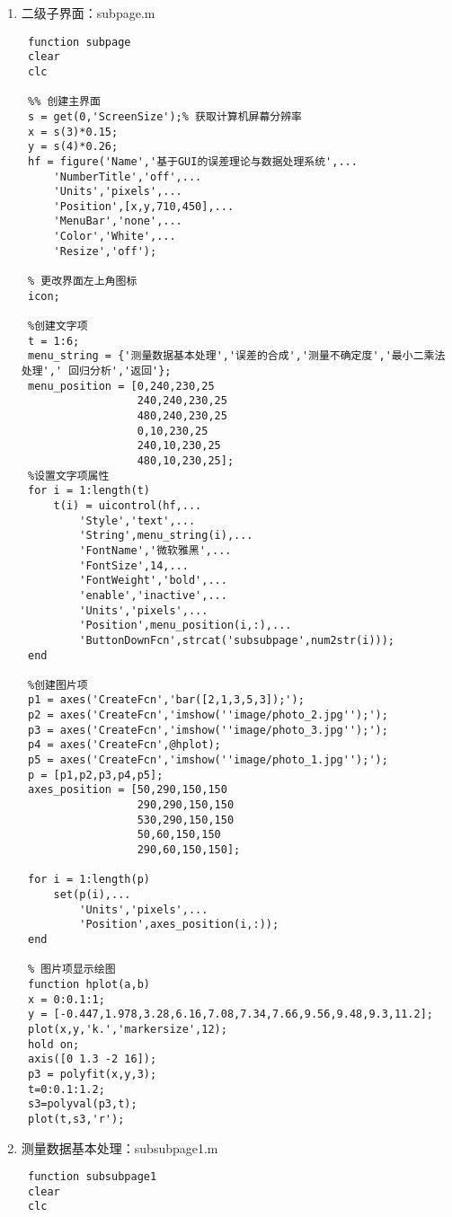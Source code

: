 \begin{enumerate}
\begin{lstlisting}
 % 显示学校名称PNG图片函数
 function school_logo(a,b)
 [I,c,alpha] = imread('image/school_logo.png');
 h = imshow(I);
 set(h,'AlphaData',alpha);
 
 %% 主界面退出对话框
 function hexit(a,b)
 he = questdlg('你确定退出吗？','退出程序','是','否','否');
 if strcmp(he,'是')
     close;
     clear;
     clc;
 end;\end{lstlisting}
	\item 二级子界面：subpage.m
	\begin{lstlisting}
 function subpage
 clear
 clc
 
 %% 创建主界面
 s = get(0,'ScreenSize');% 获取计算机屏幕分辨率
 x = s(3)*0.15;
 y = s(4)*0.26;
 hf = figure('Name','基于GUI的误差理论与数据处理系统',...
     'NumberTitle','off',...
     'Units','pixels',...
     'Position',[x,y,710,450],...
     'MenuBar','none',...
     'Color','White',...
     'Resize','off');
 
 % 更改界面左上角图标
 icon;
 
 %创建文字项
 t = 1:6;
 menu_string = {'测量数据基本处理','误差的合成','测量不确定度','最小二乘法处理',' 回归分析','返回'};
 menu_position = [0,240,230,25
                  240,240,230,25
                  480,240,230,25
                  0,10,230,25
                  240,10,230,25
                  480,10,230,25];
 %设置文字项属性
 for i = 1:length(t)
     t(i) = uicontrol(hf,...
         'Style','text',...
         'String',menu_string(i),...
         'FontName','微软雅黑',...
         'FontSize',14,...
         'FontWeight','bold',...
         'enable','inactive',...
         'Units','pixels',...
         'Position',menu_position(i,:),...
         'ButtonDownFcn',strcat('subsubpage',num2str(i)));
 end
 
 %创建图片项
 p1 = axes('CreateFcn','bar([2,1,3,5,3]);');
 p2 = axes('CreateFcn','imshow(''image/photo_2.jpg'');');
 p3 = axes('CreateFcn','imshow(''image/photo_3.jpg'');');
 p4 = axes('CreateFcn',@hplot);
 p5 = axes('CreateFcn','imshow(''image/photo_1.jpg'');');
 p = [p1,p2,p3,p4,p5];
 axes_position = [50,290,150,150
                  290,290,150,150
                  530,290,150,150
                  50,60,150,150
                  290,60,150,150];
 
 for i = 1:length(p)
     set(p(i),...
         'Units','pixels',...
         'Position',axes_position(i,:));
 end
 
 % 图片项显示绘图
 function hplot(a,b)
 x = 0:0.1:1;
 y = [-0.447,1.978,3.28,6.16,7.08,7.34,7.66,9.56,9.48,9.3,11.2];
 plot(x,y,'k.','markersize',12);
 hold on;
 axis([0 1.3 -2 16]);
 p3 = polyfit(x,y,3);
 t=0:0.1:1.2;
 s3=polyval(p3,t);
 plot(t,s3,'r');\end{lstlisting}
	\item 测量数据基本处理：subsubpage1.m
	\begin{lstlisting}
 function subsubpage1
 clear
 clc


\end{lstlisting}
\end{enumerate}
